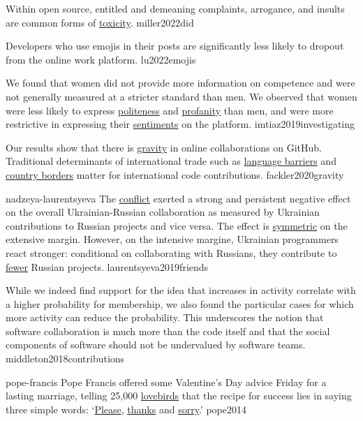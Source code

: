 \documentclass{article}
\begin{document}
  {Within open source, entitled and demeaning complaints, arrogance, and insults are common forms of \ul{toxicity}.}
  {miller2022did}

  {Developers who use emojis in their posts are significantly less likely to dropout from the online work platform.}
  {lu2022emojis}

  {We found that women did not provide more information on competence and were not generally measured at a stricter standard than men. We observed that women were less likely to express \ul{politeness} and \ul{profanity} than men, and were more restrictive in expressing their \ul{sentiments} on the platform.}
  {imtiaz2019investigating}

  {Our results show that there is \ul{gravity} in online collaborations on GitHub. Traditional determinants of international trade such as \ul{language barriers} and \ul{country borders} matter for international code contributions.}
  {fackler2020gravity}

\qte
  {nadzeya-laurentsyeva}
  {The \ul{conflict} exerted a strong and persistent negative effect on the overall
  Ukrainian-Russian collaboration as measured by Ukrainian contributions
  to Russian projects and vice versa. The effect is \ul{symmetric} on the extensive margin.
  However, on the intensive margine, Ukrainian programmers react stronger: conditional
  on collaborating with Russians, they contribute to \ul{fewer} Russian projects.}
  {laurentsyeva2019friends}

  {While we indeed find support for the idea that increases in activity correlate with a higher probability for membership, we also found the particular cases for which more activity can reduce the probability. This underscores the notion that software collaboration is much more than the code itself and that the social components of software should not be undervalued by software teams.}
  {middleton2018contributions}

\qte
  {pope-francis}
  {Pope Francis offered some Valentine’s Day advice Friday for a lasting marriage, telling 25,000 \ul{lovebirds} that the recipe for success lies in saying three simple words: `\ul{Please}, \ul{thanks} and \ul{sorry}.'{}}
  {pope2014}
\end{document}
